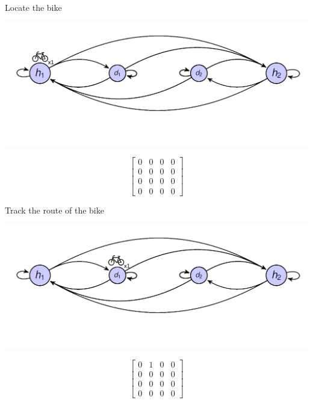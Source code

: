 \begin{frame}{Locate the bike}
	
\begin{center}

\includegraphics[width=\linewidth]{graphics/createmarkov_initial}


$$
\begin{bmatrix}
0 & 0 & 0 & 0\\
0 & 0 & 0 & 0\\
0 & 0 & 0 & 0\\
0 & 0 & 0 & 0
\end{bmatrix}
$$
\end{center}
	
\end{frame}

\begin{frame}{Track the route of the bike}
	
	\begin{center}
		
		\includegraphics[width=\linewidth]{graphics/createmarkov_firststep}
		
		
		$$
		\begin{bmatrix}
		0 & 1 & 0 & 0\\
		0 & 0 & 0 & 0\\
		0 & 0 & 0 & 0\\
		0 & 0 & 0 & 0
		\end{bmatrix}
		$$
	\end{center}
	
\end{frame}

